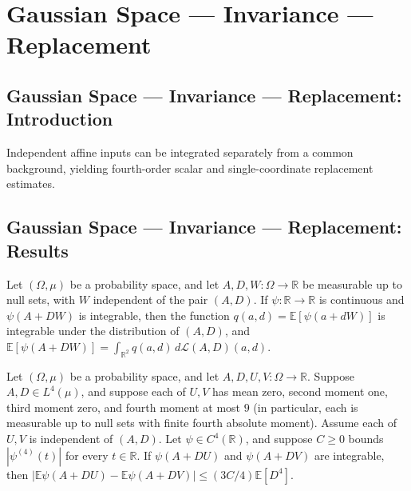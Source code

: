\section{Gaussian Space --- Invariance --- Replacement}
\subsection*{Gaussian Space --- Invariance --- Replacement: Introduction}
Independent affine inputs can be integrated separately from a common background, yielding fourth-order scalar and single-coordinate replacement estimates.

\subsection*{Gaussian Space --- Invariance --- Replacement: Results}

\begin{theorem}
\leanok
{}
Let $(\Omega,\mu)$ be a probability space, and let $A,D,W\colon\Omega\to\mathbb R$ be
measurable up to null sets, with $W$ independent of the pair $(A,D)$. If
$\psi\colon\mathbb R\to\mathbb R$ is continuous and $\psi(A+DW)$ is integrable, then the
function $q(a,d)=\mathbb E[\psi(a+dW)]$ is integrable under the distribution of $(A,D)$,
and $\mathbb E[\psi(A+DW)]=\int_{\mathbb R^2}q(a,d)\,d\mathcal L(A,D)(a,d)$.
\end{theorem}

\begin{theorem}
\leanok
{}
Let $(\Omega,\mu)$ be a probability space, and let $A,D,U,V\colon\Omega\to\mathbb R$.
Suppose $A,D\in L^4(\mu)$, and suppose each of $U,V$ has mean zero, second moment one,
third moment zero, and fourth moment at most $9$ (in particular, each is measurable up
to null sets with finite fourth absolute moment). Assume each of $U,V$ is independent of
$(A,D)$. Let $\psi\in C^4(\mathbb R)$, and suppose $C\ge0$ bounds $|\psi^{(4)}(t)|$ for
every $t\in\mathbb R$. If $\psi(A+DU)$ and $\psi(A+DV)$ are integrable, then
$\left|\mathbb E\psi(A+DU)-\mathbb E\psi(A+DV)\right|\le (3C/4)\mathbb E[D^4]$.
\end{theorem}

